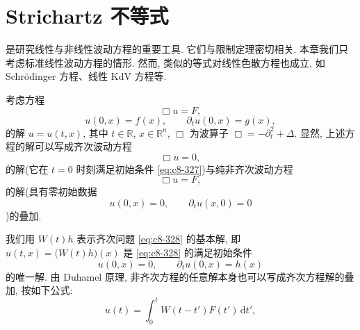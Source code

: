 
\chapter{Strichartz 不等式}

是研究线性与非线性波动方程的重要工具. 它们与限制定理密切相关. 本章我们只考虑标准线性波动方程的情形. 然而, 类似的等式对线性色散方程也成立, 如 Schrödinger 方程、线性 KdV 方程等. 


考虑方程
\begin{equation}
\Box u=F, \label{eq:c8-326}
\end{equation}
\begin{equation}
u(0, x)=f(x), \qquad \partial_t u(0, x)=g(x), \label{eq:c8-327}
\end{equation}
的解 $u=u(t, x)$, 其中 $t\in\mathbb{R}$, $x\in\mathbb{R}^n$, $\Box$ 为波算子 $\Box=-\partial_t^2+\Delta$. 显然, 上述方程的解可以写成齐次波动方程
\begin{equation}
\Box u=0, \label{eq:c8-328}
\end{equation}
的解(它在 $t=0$ 时刻满足初始条件 \eqref{eq:c8-327})与纯非齐次波动方程
\begin{equation}
\Box u=F, \label{eq:c8-329}
\end{equation}
的解(具有零初始数据
\[
u(0, x)=0, \qquad \partial_t u(x, 0)=0
\]
)的叠加. 

我们用 $W(t)h$ 表示齐次问题 \eqref{eq:c8-328} 的基本解, 即 $u(t, x)=\bigl(W(t)h\bigr)(x)$ 是 \eqref{eq:c8-328} 的满足初始条件
\[
u(0, x)=0, \qquad \partial_t u(0, x)=h(x)
\]
的唯一解. 由 Duhamel 原理, 非齐次方程的任意解本身也可以写成齐次方程解的叠加, 按如下公式:
\begin{equation}
u(t)=\int_0^t W(t-t')F(t')\, \mathrm{d}t', \label{eq:c8-330}
\end{equation}

